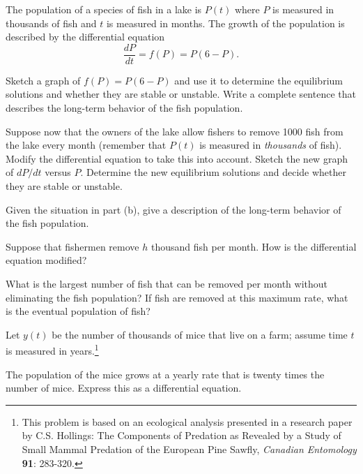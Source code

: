 \begin{exercises}
  \item The population of a species of fish in a lake is $P(t)$ where
    $P$ is measured in thousands of fish and $t$ is measured in
    months.  The growth of the population is described by the
    differential equation
    $$
    \frac{dP}{dt} = f(P) = P(6-P).
    $$

   \ba
   \item  Sketch a graph of $f(P) = P(6-P)$ and use it to determine the
    equilibrium solutions and whether they are stable or unstable.
    Write a complete sentence that describes the long-term behavior of
    the fish population.

    \item Suppose now that the owners of the lake allow fishers to
    remove 1000 fish from the lake every month (remember that $P(t)$
    is measured in {\em thousands} of fish).  Modify the differential
    equation to take this into account.  Sketch the new graph of
    $dP/dt$ versus $P$.  Determine the new equilibrium solutions and
    decide whether they are stable or unstable.  

    \item  Given the situation in part (b), give a description of
    the long-term behavior of the fish population.

    \item  Suppose that fishermen remove $h$ thousand fish per month.  
    How is the differential equation modified?  

    \item  What is the largest
    number of fish that can be removed per month without eliminating the fish
    population?  If fish are removed at this maximum rate, what is the
    eventual population of fish?
    
    \ea

  \item Let $y(t)$ be the number of thousands of mice that live on a
    farm;  assume time $t$ is measured in years.\footnote{This problem is based on an ecological analysis
    presented in a research paper by C.S. Hollings:  The Components of
    Predation as Revealed by a Study of Small Mammal Predation of the
    European Pine Sawfly, {\em Canadian Entomology} {\bf 91}: 283-320.  }

    \ba
    \item  The population of the mice grows at a yearly rate that is twenty times 
    the number of mice.  Express this as a differential equation.


\end{exercises}
